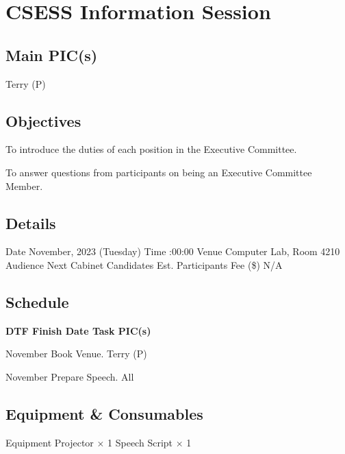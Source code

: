 \section{CSESS Information Session}

\subsection{Main PIC(s)}
Terry (P)

\subsection{Objectives}
\startitemize
\item To introduce the duties of each position in the Executive Committee.
\item To answer questions from participants on being an Executive Committee Member.
\stopitemize

\subsection{Details}
\starttabulate[|rB|l|]
\NC Date
 November, 2023 (Tuesday) \NR
\NC Time
:00:00 \NR
\NC Venue
\NC Computer Lab, Room 4210 \NR
\NC Audience
\NC Next Cabinet Candidates \NR
\NC Est. Participants
 \NR
\NC Fee (\$)
\NC N/A \NR
\stoptabulate

\subsection{Schedule}

\setupTABLE[c][1][width=0.75in]
\setupTABLE[c][2][width=1in]
\setupTABLE[c][3][width=3in]
\setupTABLE[c][4][width=1.25in]
\bTABLE
\bTABLEhead

\bTR\bTH    \bf{DTF}
\eTH\bTH    \bf{Finish Date}
\eTH\bTH    \bf{Task}
\eTH\bTH    \bf{PIC(s)}
\eTH\eTR

\eTABLEhead
\bTABLEbody

\bTR{}
\eTD{} November
\eTD\bTD Book Venue.
\eTD\bTD Terry (P)
\eTD\eTR

\bTR{}
\eTD{} November
\eTD\bTD Prepare Speech.
\eTD\bTD All
\eTD\eTR

\eTABLEbody
\eTABLE

\subsection{Equipment \& Consumables}
\starttabulate[|l|l|]
\NC{}Equipment\NC\NR
\HL
\NC Projector \NC $\times$ 1 \NR
\NC Speech Script \NC $\times$ 1 \NR
\HL
\stoptabulate

